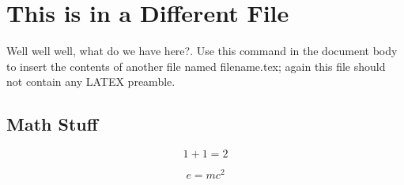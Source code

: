 \chapter{This is in a Different File}
Well well well, what do we have here?. Use this command in the document body to insert the contents of another file named filename.tex; again this file should not contain any LATEX preamble. 

\section{Math Stuff}
\lipsum[1]

\[1+1=2\]


\begin{equation}
	e=mc^2
\end{equation}
